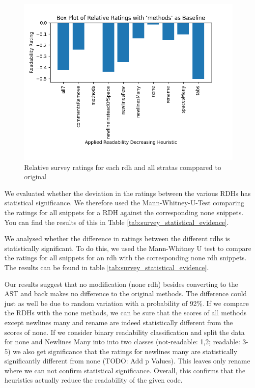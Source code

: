 \documentclass[%
class=scrreprt,
chapterprefix=false,%
open=right,%
twoside=false,%
paper=a4,%
logofile={Logo\_zentral\_farbig\_EN.png},%
thesistype=master,%
UKenglish,%
]{se2thesis}
\theoremstyle{definition}
\begin{document}
	\begin{figure}[t]
		\centering
		\includegraphics[width=\textwidth]{img/survey_ratings_bar_all.png}
		\caption{Relative survey ratings for each rdh and all stratas comppared to original}
		\label{fig:survey_ratings_bar_all}
	\end{figure}
		
	We evaluated whether the deviation in the ratings between the various RDHs has statistical significance. We therefore used the Mann-Whitney-U-Test comparing the ratings for all snippets for a RDH against the corresponding none snippets. You can find the results of this in Table \ref{tab:survey_statistical_evidence}.
	
	We analysed whether the difference in ratings between the different rdhs is statistically significant. To do this, we used the Mann-Whitney U test to compare the ratings for all snippets for an rdh with the corresponding none rdh snippets. The results can be found in table \ref{tab:survey_statistical_evidence}.
	
	Our results suggest that no modification (none rdh) besides converting to the AST and back makes no difference to the original methods. The difference could just as well be due to random variation with a probability of 92\%. If we compare the RDHs with the none methods, we can be sure that the scores of all methods except newlines many and rename are indeed statistically different from the scores of none. If we consider binary readability classification and split the data for none and Newlines Many into into two classes (not-readable: 1,2; readable: 3-5) we also get significance that the ratings for newlines many are statistically significantly different from none (TODO: Add p Values). This leaves only rename where we can not confirm statistical significance. Overall, this confirms that the heuristics actually reduce the readability of the given code.
	
\end{document}
